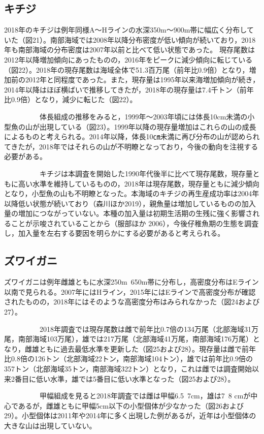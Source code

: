 \documentclass[11pt]{article} %
\begin{document}
\begin{linenumbers}
\subsection{キチジ}
2018年のキチジは例年同様A～Hラインの水深350m～900m帯に幅広く分布していた（図21）。南部海域では2008年以降分布密度が低い傾向が続いており，2018年も南部海域の分布密度は2007年以前と比べて低い状態であった。
現存尾数は2012年以降増加傾向にあったものの，2016年をピークに減少傾向に転じている（図22）。2018年の現存尾数は海域全体で51.3百万尾（前年比0.9倍）となり，増加前の2012年と同程度であった。また，現存量は1995年以来海増加傾向が続き，2014年以降はほぼ横ばいで推移してきたが，2018年の現存量は7.4千トン（前年比0.9倍）となり，減少に転じた（図22）。

\ \ \ \ \ \ \ \ \ \ 
体長組成の推移をみると，1999年～2003年頃には体長10cm未満の小型魚の山が出現している（図23）。1999年以降の現存量増加はこれらの山の成長によるものと考えられる。2014年以降，体長10㎝未満に再び分布の山が認められてきたが，2018年ではそれらの山が不明瞭となっており，今後の動向を注視する必要がある。

\ \ \ \ \ \ \ \ \ \ 
キチジは本調査を開始した1990年代後半に比べて現存尾数，現存量ともに高い水準を維持しているものの，2018年は現存尾数，現存量ともに減少傾向となり，小型魚の山も不明瞭となった。本海域のキチジの再生産成功率は2004年以降低い状態が続いており（森川ほか2019），親魚量は増加しているものの加入量の増加につながっていない。本種の加入量は初期生活期の生残に強く影響されることが示唆されていることから（服部ほか 2006），今後仔稚魚期の生態を調査し，加入量を左右する要因を明らかにする必要があると考えられる。

\subsection{ズワイガニ}
ズワイガニは例年雌雄ともに水深250m~650m帯に分布し，高密度分布はEライン以南で見られる。2007年にはHライン，2015年にはEラインで高密度分布が確認されたものの，2018年にはそのような高密度分布はみられなかった（図24および27）。

\ \ \ \ \ \ \ \ \ \ 
2018年調査では現存尾数は雌で前年比0.7倍の134万尾（北部海域31万尾，南部海域103万尾），雄では217万尾（北部海域41万尾，南部海域176万尾）となり，雌雄ともに過去最低水準を更新した（図25および28）。現存量は雌で前年比0.8倍の126トン（北部海域22トン，南部海域104トン），雄では前年比0.9倍の357トン（北部海域35トン，南部海域322トン）となり，これは雌では調査開始以来2番目に低い水準，雄では5番目に低い水準となった（図25および28）。

\ \ \ \ \ \ \ \ \ \ 
甲幅組成を見ると2018年調査では雌は甲幅6.5~7cm，雄は7~8 cmが中心であるが，雌雄ともに甲幅5cm以下の小型個体が少なかった（図26および29）。小型個体は2011年や2014年に多く出現した例があるが，近年は小型個体の大きな山は出現していない。


\end{linenumbers}
\end{document}
